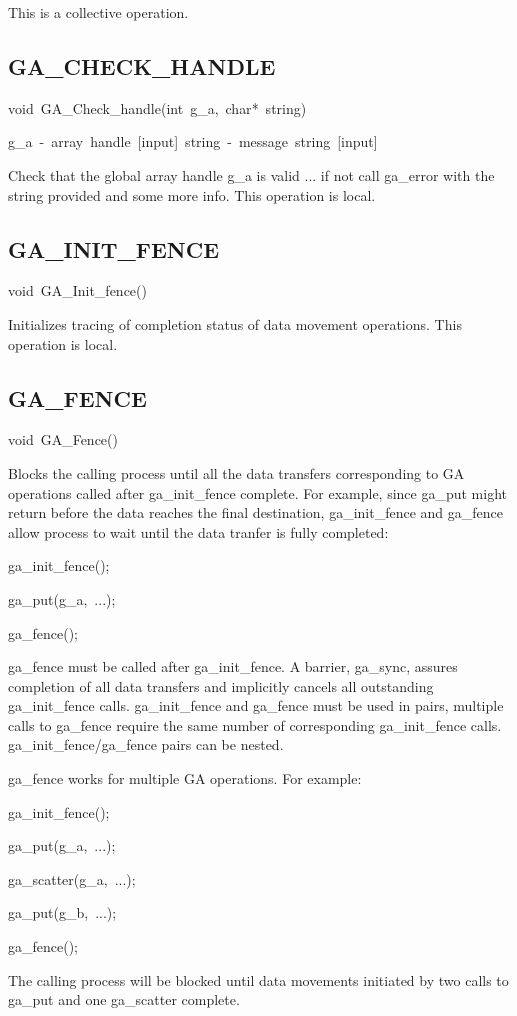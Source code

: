 This is a collective operation. 


\subsection*{\label{sub:GA_CHECK_HANDLE}GA\_CHECK\_HANDLE}
\begin{lyxcode}
void~GA\_Check\_handle(int~g\_a,~char{*}~string)

g\_a~-~array~handle~{[}input{]}~string~-~message~string~{[}input{]}
\end{lyxcode}
Check that the global array handle g\_a is valid ... if not call ga\_error
with the string provided and some more info. This operation is local. 


\subsection*{\label{sub:GA_INIT_FENCE}GA\_INIT\_FENCE}
\begin{lyxcode}
void~GA\_Init\_fence()
\end{lyxcode}
Initializes tracing of completion status of data movement operations.
This operation is local. 


\subsection*{\label{sub:GA_FENCE}GA\_FENCE}
\begin{lyxcode}
void~GA\_Fence()
\end{lyxcode}
Blocks the calling process until all the data transfers corresponding
to GA operations called after ga\_init\_fence complete. For example,
since ga\_put might return before the data reaches the final destination,
ga\_init\_fence and ga\_fence allow process to wait until the data
tranfer is fully completed:
\begin{lyxcode}
ga\_init\_fence();~

ga\_put(g\_a,~...);~

ga\_fence();
\end{lyxcode}
ga\_fence must be called after ga\_init\_fence. A barrier, ga\_sync,
assures completion of all data transfers and implicitly cancels all
outstanding ga\_init\_fence calls. ga\_init\_fence and ga\_fence must
be used in pairs, multiple calls to ga\_fence require the same number
of corresponding ga\_init\_fence calls. ga\_init\_fence/ga\_fence
pairs can be nested.

ga\_fence works for multiple GA operations. For example:
\begin{lyxcode}
ga\_init\_fence();~

ga\_put(g\_a,~...);

ga\_scatter(g\_a,~...);~

ga\_put(g\_b,~...);~

ga\_fence();
\end{lyxcode}
The calling process will be blocked until data movements initiated
by two calls to ga\_put and one ga\_scatter complete. 


